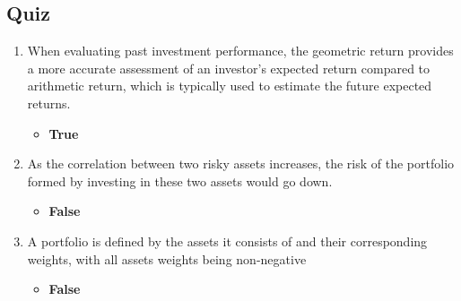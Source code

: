 \begin{tiny}
  \subsection{Quiz}
  \begin{enumerate}
    \item When evaluating past investment performance, the geometric return provides a more accurate assessment of an investor's expected return compared to arithmetic return, which is typically used to estimate the future expected returns.
          \begin{itemize}[itemsep=-0.2em]
            \item \textbf{True}
          \end{itemize}
    \item As the correlation between two risky assets increases, the risk of the portfolio formed by investing in these two assets would go down.
          \begin{itemize}[itemsep=-0.2em]
            \item \textbf{False}
          \end{itemize}
    \item A portfolio is defined by the assets it consists of and their corresponding weights, with all assets weights being non-negative
          \begin{itemize}[itemsep=-0.2em]
            \item \textbf{False}
          \end{itemize}
  \end{enumerate}
\end{tiny}